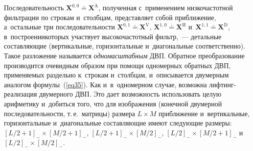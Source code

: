 \begin{multicols}{2}
Последовательность $\mathbf{X}^{0,0}\doteq\mathbf{X}^{\mathrm{A}}$, 
полученная с~применением низкочастотной фильтрации по строкам и~столбцам, 
представляет собой приближение, а~остальные три последовательности
$\mathbf{X}^{0,1}\doteq\mathbf{X}^{\mathrm{V}}$, 
$\mathbf{X}^{1,0}\doteq\mathbf{X}^{\mathrm{H}}$ 
и~$\mathbf{X}^{1,1}\doteq\mathbf{X}^{\mathrm{D}}$, в~построении\linebreak которых 
участвует высокочастотный фильтр,~--- детальные со\-став\-ля\-ющие (вертикальные, 
горизонтальные и~диагональные соответственно). Такое разложение называется 
\textit{одномасштабным} ДВП. Обратное преобразование производится очевидным 
образом при помощи одномерных обратных ДВП, применяемых раздельно к~строкам и~столбцам, 
и~описывается двумерным аналогом формулы~(\ref{eq35}). Как и~в~одномерном случае, 
возможна лиф\-тинг-ре\-а\-ли\-за\-ция двумерного ДВП. Это дает возможность 
использовать целую арифметику и~добиться того, что для изображения 
(конечной двумерной последовательности, т.\,е.\ мат\-ри\-цы) размера 
$L\times M$ приближение и~вертикальные, горизонтальные и~диагональные составляющие 
имеют следующие размеры: $[L/2+1]_-\times[M/2+1]_-$, 
$[L/2+1]_-\times[M/2]_-$, $[L/2]_-\times[M/2+1]_-$ и~$[L/2]_-\times[M/2]_-$.

\begin{figure*} %
\vspace*{1pt}
\begin{center}
\mbox{%
\epsfxsize=148.291mm
}
\end{center}
\vspace*{-9pt}
\label{fig4}
\vspace*{4pt}
\end{figure*}



\end{multicols}
